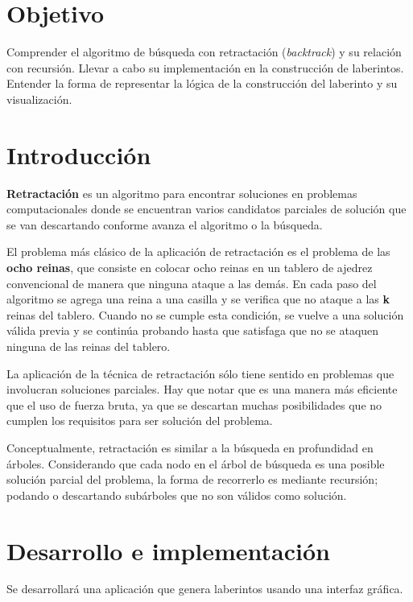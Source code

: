 

\section{Objetivo}
Comprender el algoritmo de búsqueda con retractación (\textit{backtrack}) y su relación con recursión. Llevar a cabo su implementación en la construcción de laberintos. Entender la forma de representar la lógica de la construcción del laberinto y su visualización. \par

\section{Introducci\'on}
\textbf{Retractación} es un algoritmo para encontrar soluciones en problemas computacionales donde se encuentran varios candidatos parciales de solución que se van descartando conforme avanza el algoritmo o la búsqueda.

El problema más clásico de la aplicación de retractación es el problema de las \textbf{ocho reinas}, que consiste en colocar ocho reinas en un tablero de ajedrez convencional de manera que ninguna ataque a las demás. En cada paso del algoritmo se agrega una reina a una casilla y se verifica que no ataque a las \textbf{k} reinas del tablero. Cuando no se cumple esta condición, se vuelve a una solución válida previa y se continúa probando hasta que satisfaga que no se ataquen ninguna de las reinas del tablero.\par

La aplicación de la técnica de retractación sólo tiene sentido en problemas que involucran soluciones parciales. Hay que notar que es una manera más eficiente que el uso de fuerza bruta, ya que se descartan muchas posibilidades que no cumplen los requisitos para ser solución del problema.

Conceptualmente, retractación es similar a la búsqueda en profundidad en árboles. Considerando que cada nodo en el árbol de búsqueda es una posible solución parcial del problema, la forma de recorrerlo es mediante recursión; podando o descartando subárboles que no son válidos como solución.\par


\section{Desarrollo e implementaci\'on}

\noindent Se desarrollará una aplicación que genera laberintos usando una interfaz gráfica.

